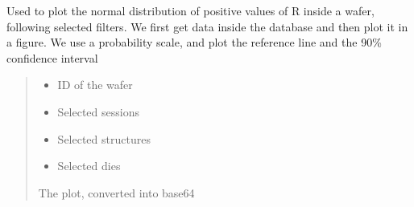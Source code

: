 \documentclass[letterpaper,10pt,english]{sphinxmanual}
\begin{document}
\begin{fulllineitems}
\label{\detokenize{normal_plots:normal_plots.R_normal_distrib_pos}}
\pysigstartsignatures
{}
\pysigstopsignatures
\sphinxAtStartPar
Used to plot the normal distribution of positive values of R inside a wafer, following selected filters.
We first get data inside the database and then plot it in a figure. We use a probability scale, and plot the reference line and the 90\% confidence interval
\begin{quote}\begin{description}
\begin{itemize}
\item {} 
\sphinxAtStartPar
{} \textendash{} ID of the wafer

\item {} 
\sphinxAtStartPar
{} \textendash{} Selected sessions

\item {} 
\sphinxAtStartPar
{} \textendash{} Selected structures

\item {} 
\sphinxAtStartPar
{} \textendash{} Selected dies

\end{itemize}

\sphinxAtStartPar
The plot, converted into base64

\end{description}\end{quote}

\end{fulllineitems}

\end{document}
